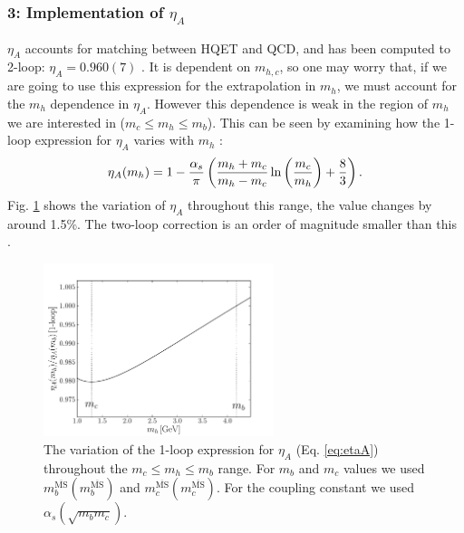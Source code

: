 \subsubsection{3: Implementation of $\eta_A$}

$\eta_A$ accounts for matching between HQET and QCD, and has been computed to 2-loop: $\eta_A = 0.960(7)$ \cite{PhysRevLett.76.4124}. It is dependent on $m_{h,c}$, so one may worry that, if we are going to use this expression for the extrapolation in $m_h$, we must account for the $m_h$ dependence in $\eta_A$. However this dependence is weak in the region of $m_h$ we are interested in ($m_c \leq m_h \leq m_b$). This can be seen by examining how the 1-loop expression for $\eta_A$ varies with $m_h$ \cite{CLOSE1984209}:
\begin{align}
  \eta_A(m_h) = 1 - {\alpha_s \over \pi} \left( {m_h+m_c\over m_h-m_c} \ln\left({m_c\over m_h}\right) + {8\over 3} \right).
  \label{eq:etaA}
\end{align}
Fig. \ref{fig:etaAV} shows the variation of $\eta_A$ throughout this range, the value changes by around 1.5\%. The two-loop correction is an order of magnitude smaller than this \cite{PhysRevLett.76.4124}.

\begin{figure}[htb!]
  \begin{center}
  \includegraphics[width=0.6\textwidth]{images/BsDsstar/etaAV.pdf}
  \caption{The variation of the 1-loop expression for $\eta_{A}$ (Eq. \eqref{eq:etaA}) throughout the $m_c \leq m_h \leq m_b$ range. For $m_b$ and $m_c$ values we used $m^{\overline{\text{MS}}}_b(m^{\overline{\text{MS}}}_b)$ and $m^{\overline{\text{MS}}}_c(m^{\overline{\text{MS}}}_c)$. For the coupling constant we used $\alpha_s(\sqrt{m_b m_c})$. \label{fig:etaAV}}
  \end{center}
  \vspace{-10pt}
\end{figure}

